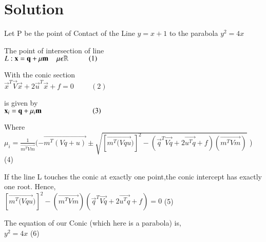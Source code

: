 \documentclass[journal,12pt,twocolumn]{IEEEtran}
\begin{document}
\section{Solution}
\raggedright
Let P be the point of Contact of the Line $y = x + 1$ to the parabola  $y^2 = 4x$\\

\vspace{0.25cm}


The point of intersection of line\\
\vspace{0.25cm}
\centering
$L : \vec{x} = \vec{q} + \mu \vec{m}  \hspace{0.4cm} \mu \epsilon \mathbb{R} \hspace{1cm} (1)$\\
\vspace{0.25cm}
\raggedright
With the conic section\\
\vspace{0.25cm}
\centering
$ \vec{x}^T \vec{V}\vec{x} + 2 \vec{u}^T \vec{x} + f = 0 \hspace{1cm} (2)$\\
\vspace{0.25cm}
\raggedright
is given by\\
\vspace{0.25cm}
\centering
$ \vec{x}_i = \vec{q} + \mu_i \vec{m} \hspace{2.5cm} (3)$ \\
\vspace{0.25cm}
\raggedright
Where\\
\vspace{0.25cm}
$\mu_i = \frac{1}{\vec{m^T Vm}}(-\vec{m^T(Vq+u)} \pm \sqrt{[\vec{m^T(Vqu})]^2 - (\vec{q}^T \vec{Vq} + 2 \vec{u^T q} + f) (\vec{m^T Vm})}$ ) \hspace{0.1cm} (4) \\
\vspace{0.25cm}
\raggedright
If the line L touches the conic at exactly one point,the conic intercept has exactly one root. Hence, \\
\vspace{0.25cm}
\centering
$ [\vec{m^T(Vqu})]^2 - (\vec{m^T Vm}) (\vec{q}^T \vec{Vq} + 2 \vec{u^T q} + f)  = 0$ (5)\\
\vspace{0.25cm}
\raggedright
The equation of our Conic (which here is a parabola) is,\\
\vspace{0.25cm}
\centering 
$y^2 = 4x$ \hspace{2.2cm}(6) \\
\end{document}

